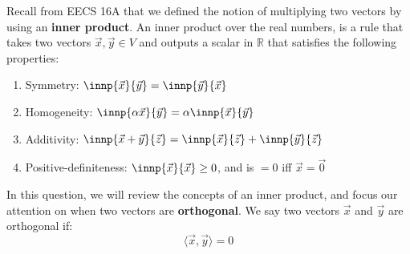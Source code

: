 

Recall from EECS 16A that we defined the notion of multiplying two vectors by using an \textbf{inner product}.
An inner product over the real numbers, is a rule that takes two vectors $\vec{x}, \vec{y} \in V$ and outputs a scalar in $\mathbb{R}$ that satisfies the following properties:


\begin{enumerate}[label=(\roman*)]
  \item Symmetry: $\innp{\vec{x}}{\vec{y}} = \innp{\vec{y}}{\vec{x}}$
  \item Homogeneity: $\innp{\alpha \vec{x}}{\vec{y}} = \alpha \innp{\vec{x}}{\vec{y}}$
  \item Additivity: $\innp{\vec{x}+\vec{y}}{\vec{z}} = \innp{\vec{x}}{\vec{z}} + \innp{\vec{y}}{\vec{z}}$
  \item Positive-definiteness: $\innp{\vec{x}}{\vec{x}} \geq 0$, and is $= 0$ iff $\vec{x} = \vec{0}$
\end{enumerate}


In this question, we will review the concepts of an inner product, and focus our attention on when two vectors are \textbf{orthogonal}. We say two vectors $\vec{x}$ and $\vec{y}$ are orthogonal if:
\begin{equation}
  \langle \vec{x}, \vec{y} \rangle = 0
\end{equation}

